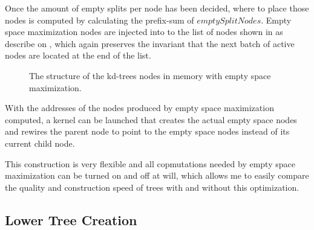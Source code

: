 Once the amount of empty splits per node has been decided, where to
place those nodes is computed by calculating the prefix-sum of
$emptySplitNodes$. Empty space maximization nodes are injected into to
the list of nodes shown in  as describe on
, which again preserves the invariant
that the next batch of active nodes are located at the end of the
list.

\begin{figure}
  \centering
  \caption{The structure of the kd-trees nodes in memory with empty
    space maximization.}
  \label{fig:emptyNodeStructure}
\end{figure}



With the addresses of the nodes produced by empty space maximization
computed, a kernel can be launched that creates the actual empty space
nodes and rewires the parent node to point to the empty space nodes
instead of its current child node. 

This construction is very flexible and all copmutations needed by
empty space maximization can be turned on and off at will, which
allows me to easily compare the quality and construction speed of
trees with and without this optimization.

\subsection{Lower Tree Creation}


